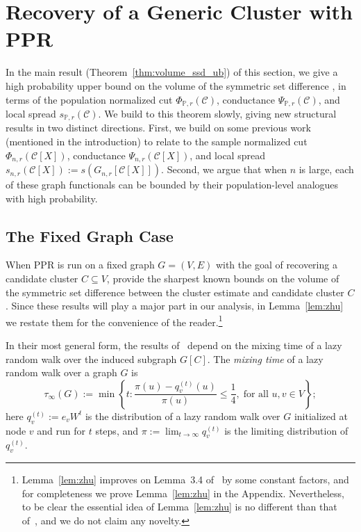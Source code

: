 \documentclass[twoside,11pt]{article}
\newcommand{\set}[1]{\left\{#1\right\}}
\newcommand{\1}{\mathbf{1}}
\newcommand{\mc}[1]{\mathcal{#1}}
\newcommand{\Pbb}{\mathbb{P}}
\newcommand{\wh}[1]{\widehat{#1}}
\begin{document}
\section{Recovery of a Generic Cluster with PPR}
\label{sec:ub_symmetric_set_difference}

In the main result (Theorem~\ref{thm:volume_ssd_ub}) of this section, we give a high probability upper bound on the volume of the symmetric set difference \smash{$\Delta(\wh{C}, \mc{C}[X])$}, in terms of the population normalized cut $\Phi_{\Pbb,r}(\mc{C})$, conductance $\Psi_{\Pbb,r}(\mc{C})$, and local spread $s_{\Pbb,r}(\mc{C})$. We build to this theorem slowly, giving new structural results in two distinct directions. First, we build on some previous work (mentioned in the introduction) to relate \smash{$\Delta(\wh{C}, \mc{C}[X])$} to the sample normalized cut $\Phi_{n,r}(\mc{C}[X])$, conductance $\Psi_{n,r}(\mc{C}[X])$, and local spread $s_{n,r}(\mc{C}[X]) := s(G_{n,r}[\mc{C}[X]])$. Second, we argue that when $n$ is large, each of these graph functionals can be bounded by their population-level analogues with high probability.

\subsection{The Fixed Graph Case}
\label{subsec:ppr_cluster_recovery_fixed_graph}
When PPR is run on a fixed graph $G = (V,E)$ with the goal of recovering a candidate cluster $C \subseteq V$, \cite{zhu2013} provide the sharpest known bounds on the volume of the symmetric set difference between the cluster estimate \smash{$\wh{C}$} and candidate cluster $C$. Since these results will play a major part in our analysis, in Lemma~\ref{lem:zhu} we restate them for the convenience of the reader.\footnote{Lemma~\ref{lem:zhu} improves on Lemma~3.4 of~\cite{zhu2013} by some constant factors, and for completeness we prove Lemma~\ref{lem:zhu} in the Appendix. Nevertheless, to be clear the essential idea of Lemma~\ref{lem:zhu} is no different than that of~\cite{zhu2013}, and we do not claim any novelty.}

In their most general form, the results of~\citet{zhu2013} depend on the mixing time of a lazy random walk over the induced subgraph $G[C]$. The \emph{mixing time} of a lazy random walk over a graph $G$ is
\begin{equation}
\label{eqn:mixing_time}
\tau_{\infty}(G) := \min\set{ t: \frac{{\pi}(u) - {q}_{v}^{(t)}(u)}
	{{\pi}(u)} \leq \frac{1}{4}, \; \text{for all $u,v \in V$}};
\end{equation}
here $q_v^{(t)} := e_v W^t$ is the distribution of a lazy random walk over $G$ initialized at node $v$ and run for $t$ steps, and $\pi := \lim_{t \to \infty} q_v^{(t)}$ is the limiting distribution of $q_v^{(t)}$.
\end{document}
